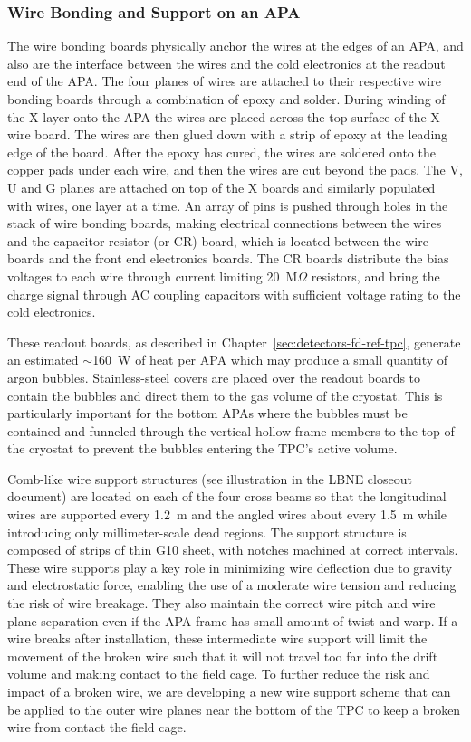 \subsubsection{Wire Bonding and Support on an APA}
\label{subsec:fd-ref-wirewrap}


The wire bonding boards physically anchor the wires at the edges of an APA, and also are the interface between the wires and the cold electronics  at the readout end of the APA.  The four planes of wires are attached to their respective wire bonding boards through a combination of epoxy and solder. During winding of the X layer onto the APA the wires are placed across the top surface of the X wire board. The wires are then glued down with a strip of epoxy at the leading edge of the board.  After the epoxy has cured, the wires are soldered onto the copper pads under each wire, and then the wires are cut beyond the pads. The V, U and G planes are attached on top of the X boards and similarly populated with wires, one layer at a time. An array of pins is pushed through holes in the stack of wire bonding boards, making electrical connections between the wires and the capacitor-resistor (or CR) board, which is located between the wire boards and the front end electronics boards.  The CR boards distribute the bias voltages to each wire through current limiting 20~M$\Omega$ resistors,  and bring the charge signal through AC coupling capacitors with sufficient voltage rating to the cold electronics.

These readout boards, as described in Chapter~\ref{sec:detectors-fd-ref-tpc}, generate an estimated $\sim$160~W of heat per APA which may produce a small quantity of argon bubbles.  Stainless-steel covers are placed over the readout boards to contain the bubbles and direct them to the gas volume of the cryostat. This is particularly important for the bottom APAs where the bubbles must be contained and funneled through the vertical hollow frame members to the top of the cryostat to prevent the bubbles entering the TPC's active volume.

Comb-like wire support structures (see illustration in the LBNE closeout document) are located on each of the four cross beams so that the longitudinal wires are supported every 1.2~m and the angled wires about every 1.5~m while introducing only millimeter-scale dead regions. The support structure is composed of strips of thin G10 sheet, with notches machined at correct intervals.  These wire supports play a key role in minimizing wire deflection due to gravity and electrostatic force, enabling the use of a moderate wire tension and reducing the risk of wire breakage.   They also maintain the correct wire pitch and wire plane separation even if the APA frame has small amount of twist and warp.  If a wire breaks after installation, these intermediate wire support will limit the movement of the broken wire such that it will not travel too far into the drift volume and making contact to the field cage.  To further reduce the risk and impact of a broken wire, we are developing a new wire support scheme that can be applied to the outer wire planes near the bottom of the TPC to keep a broken wire from contact the field cage. 


